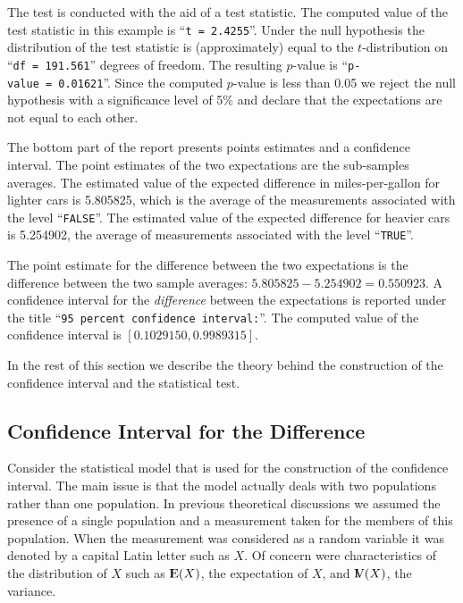 \documentclass[]{krantz}
\newcommand{\Expec}{{\rm I\kern-.3em E}}
\newcommand{\Var}{{\rm I\kern-.3em V}}
\theoremstyle{definition}
\theoremstyle{definition}
\theoremstyle{definition}
\theoremstyle{remark}
\begin{document}
The test is conducted with the aid of a test statistic. The computed
value of the test statistic in this example is ``\texttt{t\ =\ 2.4255}''. Under the
null hypothesis the distribution of the test statistic is
(approximately) equal to the \(t\)-distribution on ``\texttt{df\ =\ 191.561}''
degrees of freedom. The resulting \(p\)-value is ``\texttt{p-value\ =\ 0.01621}''.
Since the computed \(p\)-value is less than 0.05 we reject the null
hypothesis with a significance level of 5\% and declare that the
expectations are not equal to each other.

The bottom part of the report presents points estimates and a confidence
interval. The point estimates of the two expectations are the
sub-samples averages. The estimated value of the expected difference in
miles-per-gallon for lighter cars is 5.805825, which is the average of
the measurements associated with the level ``\texttt{FALSE}''. The estimated
value of the expected difference for heavier cars is 5.254902, the
average of measurements associated with the level ``\texttt{TRUE}''.

The point estimate for the difference between the two expectations is
the difference between the two sample averages:
\(5.805825 - 5.254902 = 0.550923\). A confidence interval for the
\emph{difference} between the expectations is reported under the title
``\texttt{95\ percent\ confidence\ interval:}''. The computed value of the
confidence interval is \([0.1029150, 0.9989315]\).

In the rest of this section we describe the theory behind the
construction of the confidence interval and the statistical test.

\hypertarget{confidence-interval-for-the-difference}{%
\subsection{Confidence Interval for the Difference}\label{confidence-interval-for-the-difference}}

Consider the statistical model that is used for the construction of the
confidence interval. The main issue is that the model actually deals
with two populations rather than one population. In previous theoretical
discussions we assumed the presence of a single population and a
measurement taken for the members of this population. When the
measurement was considered as a random variable it was denoted by a
capital Latin letter such as \(X\). Of concern were characteristics of the
distribution of \(X\) such as \(\Expec(X)\), the expectation of \(X\), and
\(\Var(X)\), the variance.
\end{document}
